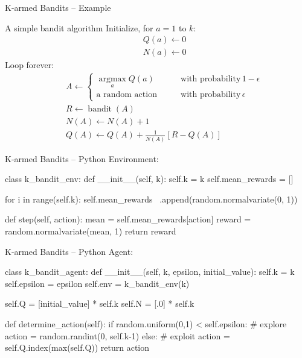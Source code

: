 \documentclass[ignorenonframetext,xcolor=x11names]{beamer}
\begin{document}
\begin{frame}{K-armed Bandits -- Example}
\begin{block}{A simple bandit algorithm}
Initialize, for $a=1$ to $k$:
\begin{align*}
&\quad Q(a) \leftarrow 0 \\
&\quad N(a) \leftarrow 0
\end{align*}
Loop forever:
\begin{align*}
&\quad A \leftarrow \begin{cases} \operatorname*{arg max}_a Q(a) &\qquad \text{with probability}\, 1-\epsilon \\
\text{a random action} &\qquad \text{with probability}
\, \epsilon
\end{cases} \\
&\quad R \leftarrow \operatorname{bandit}(A) \\
&\quad N(A) \leftarrow N(A) + 1 \\
&\quad Q(A) \leftarrow Q(A) + \frac{1}{N(A)} \left[ R - Q(A) \right]
\end{align*}
\end{block}
\end{frame}

\begin{frame}[fragile]{K-armed Bandits -- Python}
Environment:
\begin{pythoncode}
class k_bandit_env:
    def __init__(self, k):
        self.k = k
        self.mean_rewards = []

        for i in range(self.k):
            self.mean_rewards \
                .append(random.normalvariate(0, 1))

    def step(self, action):
        mean = self.mean_rewards[action]
        reward = random.normalvariate(mean, 1)
        return reward
\end{pythoncode}
\end{frame}

\begin{frame}[fragile]{K-armed Bandits -- Python}
Agent:
\begin{pythoncode}
class k_bandit_agent:
    def __init__(self, k, epsilon, initial_value):
        self.k = k
        self.epsilon = epsilon
        self.env = k_bandit_env(k)

        self.Q = [initial_value] * self.k
        self.N = [.0] * self.k

    def determine_action(self):
        if random.uniform(0,1) < self.epsilon:
            # explore
            action = random.randint(0, self.k-1)
        else:
            # exploit
            action = self.Q.index(max(self.Q))
        return action
\end{pythoncode}
\end{frame}
\end{document}
